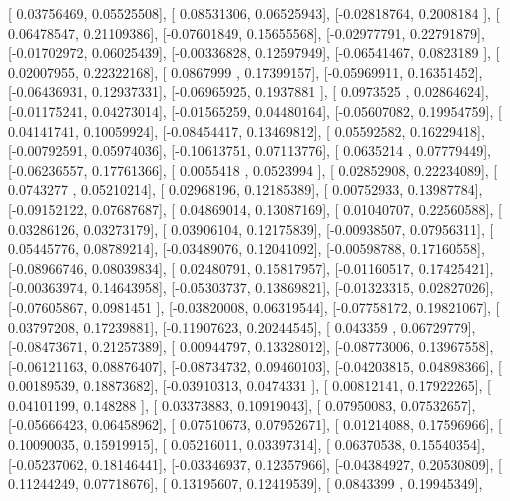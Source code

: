 \documentclass{article}
\begin{document}
       [ 0.03756469,  0.05525508],
       [ 0.08531306,  0.06525943],
       [-0.02818764,  0.2008184 ],
       [ 0.06478547,  0.21109386],
       [-0.07601849,  0.15655568],
       [-0.02977791,  0.22791879],
       [-0.01702972,  0.06025439],
       [-0.00336828,  0.12597949],
       [-0.06541467,  0.0823189 ],
       [ 0.02007955,  0.22322168],
       [ 0.0867999 ,  0.17399157],
       [-0.05969911,  0.16351452],
       [-0.06436931,  0.12937331],
       [-0.06965925,  0.1937881 ],
       [ 0.0973525 ,  0.02864624],
       [-0.01175241,  0.04273014],
       [-0.01565259,  0.04480164],
       [-0.05607082,  0.19954759],
       [ 0.04141741,  0.10059924],
       [-0.08454417,  0.13469812],
       [ 0.05592582,  0.16229418],
       [-0.00792591,  0.05974036],
       [-0.10613751,  0.07113776],
       [ 0.0635214 ,  0.07779449],
       [-0.06236557,  0.17761366],
       [ 0.0055418 ,  0.0523994 ],
       [ 0.02852908,  0.22234089],
       [ 0.0743277 ,  0.05210214],
       [ 0.02968196,  0.12185389],
       [ 0.00752933,  0.13987784],
       [-0.09152122,  0.07687687],
       [ 0.04869014,  0.13087169],
       [ 0.01040707,  0.22560588],
       [ 0.03286126,  0.03273179],
       [ 0.03906104,  0.12175839],
       [-0.00938507,  0.07956311],
       [ 0.05445776,  0.08789214],
       [-0.03489076,  0.12041092],
       [-0.00598788,  0.17160558],
       [-0.08966746,  0.08039834],
       [ 0.02480791,  0.15817957],
       [-0.01160517,  0.17425421],
       [-0.00363974,  0.14643958],
       [-0.05303737,  0.13869821],
       [-0.01323315,  0.02827026],
       [-0.07605867,  0.0981451 ],
       [-0.03820008,  0.06319544],
       [-0.07758172,  0.19821067],
       [ 0.03797208,  0.17239881],
       [-0.11907623,  0.20244545],
       [ 0.043359  ,  0.06729779],
       [-0.08473671,  0.21257389],
       [ 0.00944797,  0.13328012],
       [-0.08773006,  0.13967558],
       [-0.06121163,  0.08876407],
       [-0.08734732,  0.09460103],
       [-0.04203815,  0.04898366],
       [ 0.00189539,  0.18873682],
       [-0.03910313,  0.0474331 ],
       [ 0.00812141,  0.17922265],
       [ 0.04101199,  0.148288  ],
       [ 0.03373883,  0.10919043],
       [ 0.07950083,  0.07532657],
       [-0.05666423,  0.06458962],
       [ 0.07510673,  0.07952671],
       [ 0.01214088,  0.17596966],
       [ 0.10090035,  0.15919915],
       [ 0.05216011,  0.03397314],
       [ 0.06370538,  0.15540354],
       [-0.05237062,  0.18146441],
       [-0.03346937,  0.12357966],
       [-0.04384927,  0.20530809],
       [ 0.11244249,  0.07718676],
       [ 0.13195607,  0.12419539],
       [ 0.0843399 ,  0.19945349],
\end{document}
